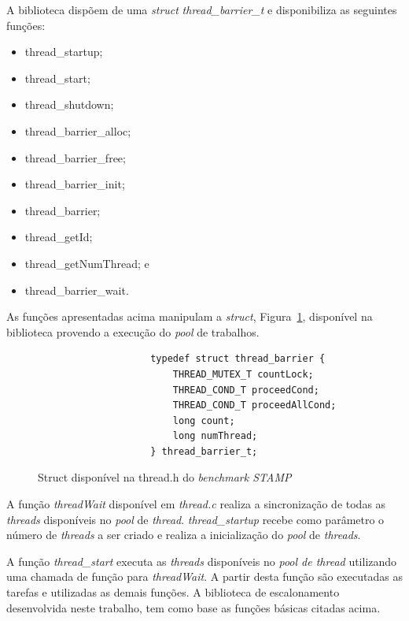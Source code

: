 \documentclass[diss,capa]{texufpel}
\begin{document}
A biblioteca dispõem de uma \emph{struct} \emph{thread\_barrier\_t} e disponibiliza as seguintes funções:

\begin{itemize}

\item thread\_startup;
\item thread\_start;
\item thread\_shutdown;
\item thread\_barrier\_alloc;
\item thread\_barrier\_free;
\item thread\_barrier\_init;
\item thread\_barrier;
\item thread\_getId;
\item thread\_getNumThread; e
\item thread\_barrier\_wait.

\end{itemize}

As funções apresentadas acima manipulam a \emph{struct}, Figura~\ref{fig:struct}, disponível na biblioteca provendo a execução do \emph{pool} de trabalhos.

\begin{figure}[!ht] 
  \centering
  \begin{verbatim}
                    typedef struct thread_barrier {
                        THREAD_MUTEX_T countLock;
                        THREAD_COND_T proceedCond;
                        THREAD_COND_T proceedAllCond;
                        long count;
                        long numThread;
                    } thread_barrier_t;
  \end{verbatim}
  \caption{Struct disponível na thread.h do \emph{benchmark STAMP}}
\label{fig:struct}
\end{figure}

A função \emph{threadWait} disponível em \emph{thread.c} realiza a sincronização de todas as \emph{threads} disponíveis no \emph{pool} de \emph{thread}. \emph{thread\_startup} recebe como parâmetro o número de \emph{threads} a ser criado e realiza a inicialização do \emph{pool} de \emph{threads}.

A função \emph{thread\_start} executa as \emph{threads} disponíveis no \emph{pool de thread} utilizando uma chamada de função para \emph{threadWait}. A partir desta função são executadas as tarefas e utilizadas as demais funções. A biblioteca de escalonamento desenvolvida neste trabalho, tem como base as funções básicas citadas acima.
\end{document}

